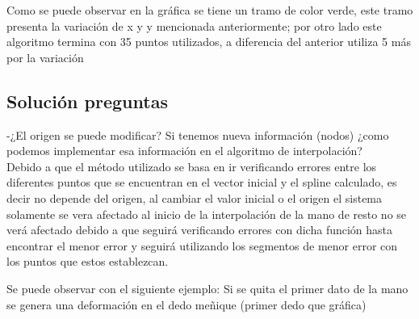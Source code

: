 \documentclass[]{article}
\begin{document}
Como se puede observar en la gráfica se tiene un tramo de color verde,
este tramo presenta la variación de x y y mencionada anteriormente; por
otro lado este algoritmo termina con 35 puntos utilizados, a diferencia
del anterior utiliza 5 más por la variación

\subsection{Solución preguntas}\label{solucion-preguntas}

-¿El origen se puede modificar? Si tenemos nueva información (nodos)
¿como podemos implementar esa información en el algoritmo de
interpolación?\\
Debido a que el método utilizado se basa en ir verificando errores entre
los diferentes puntos que se encuentran en el vector inicial y el spline
calculado, es decir no depende del origen, al cambiar el valor inicial o
el origen el sistema solamente se vera afectado al inicio de la
interpolación de la mano de resto no se verá afectado debido a que
seguirá verificando errores con dicha función hasta encontrar el menor
error y seguirá utilizando los segmentos de menor error con los puntos
que estos establezcan.

Se puede observar con el siguiente ejemplo: Si se quita el primer dato
de la mano se genera una deformación en el dedo meñique (primer dedo que
gráfica)
\end{document}
